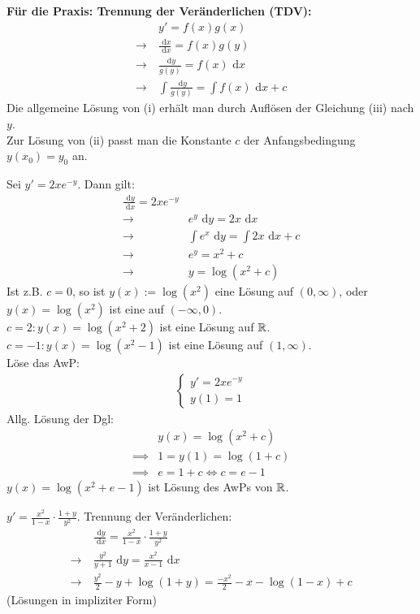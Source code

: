 \documentclass[a4paper,twoside,DIV15,BCOR12mm,chapterprefix=true,headings=twolinechapter]{scrbook}
\begin{document}
\textbf{Für die Praxis: Trennung der Veränderlichen (TDV):}\\
\begin{align*}
&y'=f(x)g(x)\\
\to\ &\frac{\text{ d}x}{\text{ d}x}=f(x)g(y)\\
\to\ &\frac{\text{ d}y}{g(y)}=f(x)\text{ d}x\\
\to\ &\int{\frac{\text{ d}y}{g(y)}}=\int f(x)\text{ d}x+c\tag{iii}
\end{align*}
Die allgemeine Lösung von (i) erhält man durch Auflösen der Gleichung (iii) nach $y$.\\
Zur Lösung von (ii) passt man die Konstante $c$ der Anfangsbedingung $y(x_0)=y_0$ an.

\begin{beispiele}
\item Sei $y'=2xe^{-y}$. Dann gilt:
\begin{align*}
\frac{\text{ d}y}{\text{ d}x}=2xe^{-y}\\
\to\ &e^y\text{ d}y = 2x\text{ d}x\\
\to\ &\int e^x\text{ d}y=\int 2x\text{ d}x+c\\
\to\ & e^y=x^2+c\\
\to\ &y=\log(x^2+c)
\end{align*}
Ist z.B. $c=0$, so ist $y(x):=\log(x^2)$ eine Lösung auf $(0,\infty)$, oder
$y(x)=\log(x^2)$ ist eine auf $(-\infty,0)$.\\
$c=2: y(x)=\log(x^2+2)$ ist eine Lösung auf $\mathbb{R}$.\\
$c=-1: y(x)=\log(x^2-1)$ ist eine Lösung auf $(1,\infty)$.\\
Löse das AwP:
\begin{align*}
\begin{cases}
y'=2xe^{-y}\\
y(1)=1
\end{cases}
\end{align*}
Allg. Lösung der Dgl:
\begin{align*}
&y(x)=\log(x^2+c)\\
\implies &1=y(1)=\log(1+c)\\
\implies &e=1+c \iff c=e-1
\end{align*}
$y(x)=\log(x^2+e-1)$ ist Lösung des AwPs von $\mathbb{R}$.
\item $y'=\frac{x^2}{1-x}\cdot\frac{1+y}{y^2}$. Trennung der Veränderlichen:
\begin{align*}
&\frac{\text{ d}y}{\text{ d}x}=\frac{x^2}{1-x}\cdot\frac{1+y}{y^2}\\
\to\ &\frac{y^2}{y+1}\text{ d}y=\frac{x^2}{x-1}\text{ d}x\\
\to\ &\frac{y^2}2-y+\log(1+y)=\frac{-x^2}2-x-\log(1-x)+c
\end{align*}
(Lösungen in impliziter Form)
\end{beispiele}
\end{document}
